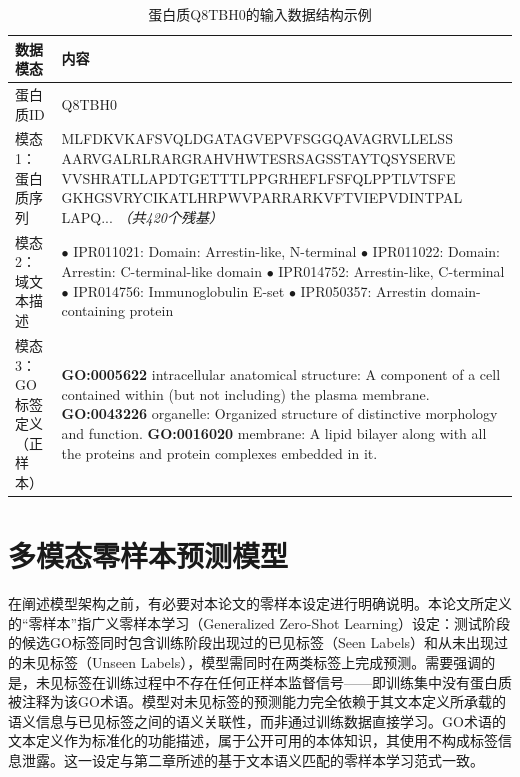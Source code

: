 \begin{table}[htbp]
    \centering
    \caption{蛋白质Q8TBH0的输入数据结构示例}
    \label{tab:mzsgo_example_data}
    \small
    \begin{tabular}{p{2.2cm} p{11cm}}
        \toprule
        \textbf{数据模态} & \textbf{内容} \\
        \midrule
        蛋白质ID & Q8TBH0 \\
        \addlinespace[5pt]
        模态1：蛋白质序列 & MLFDKVKAFSVQLDGATAGVEPVFSGGQAVAGRVLLELSS AARVGALRLRARGRAHVHWTESRSAGSSTAYTQSYSERVE VVSHRATLLAPDTGETTTLPPGRHEFLFSFQLPPTLVTSFE GKHGSVRYCIKATLHRPWVPARRARKVFTVIEPVDINTPAL LAPQ... \textit{（共420个残基）} \\
        \addlinespace[5pt]
        模态2：域文本描述 & $\bullet$ IPR011021: Domain: Arrestin-like, N-terminal \newline
        $\bullet$ IPR011022: Domain: Arrestin: C-terminal-like domain \newline
        $\bullet$ IPR014752: Arrestin-like, C-terminal \newline
        $\bullet$ IPR014756: Immunoglobulin E-set \newline
        $\bullet$ IPR050357: Arrestin domain-containing protein \\
        \addlinespace[5pt]
        模态3：GO标签定义（正样本） & \textbf{GO:0005622} intracellular anatomical structure: A component of a cell contained within (but not including) the plasma membrane. \newline
        \textbf{GO:0043226} organelle: Organized structure of distinctive morphology and function. \newline
        \textbf{GO:0016020} membrane: A lipid bilayer along with all the proteins and protein complexes embedded in it. \\
        \bottomrule
    \end{tabular}
\end{table}

\section{多模态零样本预测模型}

在阐述模型架构之前，有必要对本论文的零样本设定进行明确说明。本论文所定义的“零样本”指广义零样本学习（Generalized Zero-Shot Learning）设定：测试阶段的候选GO标签同时包含训练阶段出现过的已见标签（Seen Labels）和从未出现过的未见标签（Unseen Labels），模型需同时在两类标签上完成预测。需要强调的是，未见标签在训练过程中不存在任何正样本监督信号——即训练集中没有蛋白质被注释为该GO术语。模型对未见标签的预测能力完全依赖于其文本定义所承载的语义信息与已见标签之间的语义关联性，而非通过训练数据直接学习。GO术语的文本定义作为标准化的功能描述，属于公开可用的本体知识，其使用不构成标签信息泄露。这一设定与第二章所述的基于文本语义匹配的零样本学习范式一致。

